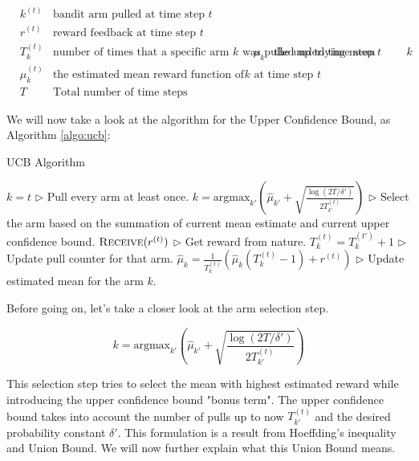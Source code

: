 \documentclass[11pt]{article}
\begin{document}
\begin{align}
    &k^{(t)} &\text{bandit arm pulled at time step $t$} \\
    &r^{(t)} &\text{reward feedback at time step $t$} \\
    &T_k^{(t)} & \text{number of times that a specific arm $k$ was pulled up to time step $t$}
    &\mu_k & \text{the underlying mean reward function of arm $k$} \\
    &\hat{\mu}_k^{(t)} & \text{the estimated mean reward function of arm $k$ at time step $t$} \\
    &T &\text{Total number of time steps}
\end{align}

We will now take a look at the algorithm for the Upper Confidence Bound, as Algorithm \ref{algo:ucb}:

\begin{algorithm}[H]
\caption{UCB Algorithm}
\label{algo:ucb}
\begin{algorithmic}[1]
        \STATE $k = t$ \hfill $\triangleright$ Pull every arm at least once.
    \ELSE
        \STATE $k = \text{argmax}_{k'}(\hat{\mu}_{k'} + \sqrt{\frac{\log(2T/\delta')}{2T_{k'}^{(t)}}})$ \hfill $\triangleright$ Select the arm based on the summation of current mean estimate and current upper confidence bound.
    \ENDIF
    \STATE $\textsc{Receive}(r^{(t)})$ \hfill $\triangleright$ Get reward from nature.
    \STATE $T_{k}^{(t)} = T_{k}^{(t')} + 1$ \hfill $\triangleright$ Update pull counter for that arm.
    \STATE $\hat{\mu}_k = \frac{1}{T_{k}^{(t)}} (\hat{\mu}_k (T_{k}^{(t)} - 1) + r^{(t)})$ \hfill $\triangleright$ Update estimated mean for the arm $k$.
\ENDFOR
\end{algorithmic}
\end{algorithm}

Before going on, let's take a closer look at the arm selection step. 

\begin{equation}
    k = \text{argmax}_{k'}(\hat{\mu}_{k'} + \sqrt{\frac{\log(2T/\delta')}{2T_{k'}^{(t)}}})
\end{equation}

This selection step tries to select the mean with highest estimated reward while introducing the upper confidence bound "bonus term". The upper confidence bound takes into account the number of pulls up to now $T_{k'}^{(t)}$ and the desired probability constant $\delta'$. This formulation is a result from Hoeffding's inequality and Union Bound. We will now further explain what this Union Bound means.
\end{document}

